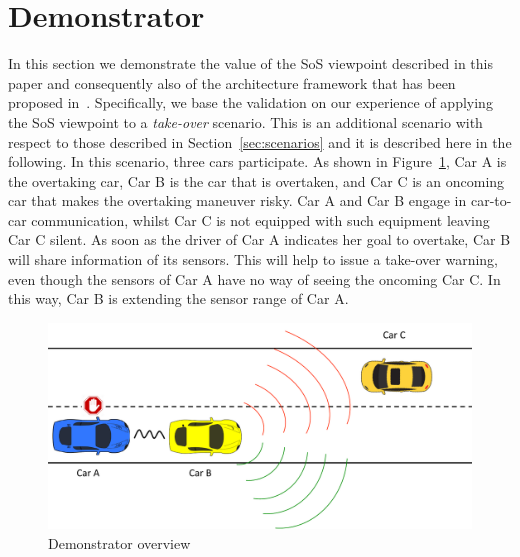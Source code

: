 \section{Demonstrator}\label{sec:demonstrator}





In this section we demonstrate the value of the SoS viewpoint described in this paper and consequently also of the architecture framework that has been proposed in~\cite{JSA2017}.
Specifically, we base the validation on our experience of applying the SoS viewpoint to a \emph{take-over} scenario.
This is an additional scenario with respect to those described in Section~\ref{sec:scenarios} and it is described here in the following.
In this scenario, three cars participate. As shown in Figure~\ref{fig:overtaking}, 
Car A is the overtaking car, Car B is the car that is overtaken, and Car C is an oncoming car that makes the overtaking maneuver risky.
Car A and Car B engage in car-to-car communication, whilst Car C is not equipped with such equipment leaving Car C silent.
As soon as the driver of Car A indicates her goal to overtake, Car B will share information of its sensors.
This will help to issue a take-over warning, even though the sensors of Car A have no way of seeing the oncoming Car C.
In this way, Car B is extending the sensor range of Car A.

\begin{figure}[htb]
	\centering
	\includegraphics[width=\linewidth]{Figures/overtaking.pdf}
	\caption{Demonstrator overview}
	\label{fig:overtaking}
\end{figure}

